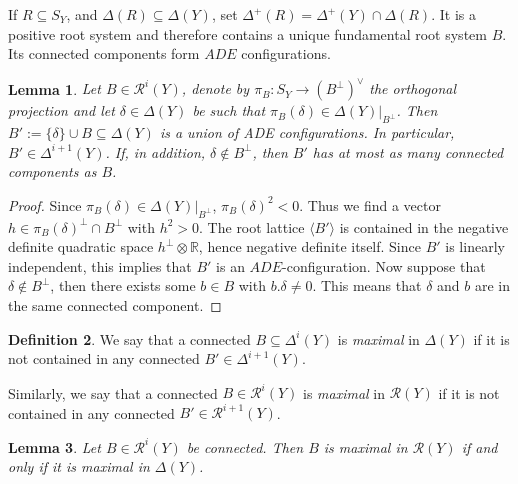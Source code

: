 \documentclass[a4paper]{amsart}
\theoremstyle{definition}
\newtheorem{definition}{Definition}[section]
\theoremstyle{plain}
\newtheorem{lemma}[definition]{Lemma}
\newcommand{\RR}{\mathbb{R}}
\newcommand{\R}{\mathcal{R}}
\begin{document}
If $R\subseteq S_Y$, and $\Delta(R)\subseteq \Delta(Y)$, set $\Delta^+(R)=\Delta^+(Y)\cap \Delta(R)$. It is a positive root system and therefore contains a unique fundamental root system $B$. Its connected components form $ADE$ configurations.

\begin{lemma}\label{lem:external_root}
Let $B \in \R^i(Y)$, denote by $\pi_B\colon S_Y \to (B^\perp)^\vee$ the orthogonal projection and let $\delta \in \Delta(Y)$ be such that $\pi_B(\delta) \in \Delta(Y)|_{B^\perp}$. Then $B':=\{\delta\} \cup B \subseteq \Delta(Y)$ is a union of ADE configurations. In particular, $B' \in \Delta^{i+1}(Y)$.
If, in addition, $\delta \not\in B^\perp$, then $B'$ has at most as many connected components as $B$.
\end{lemma}
\begin{proof}
Since $\pi_B(\delta) \in \Delta(Y)|_{B^\perp}$, $\pi_B(\delta)^2<0$. Thus we find a vector $h \in \pi_B(\delta)^\perp \cap B^\perp$ with $h^2>0$. 
The root lattice $\langle B' \rangle$ is contained in the negative definite quadratic space $h^\perp \otimes \RR$, hence negative definite itself.
Since $B'$ is linearly independent, this implies that $B'$ is an $ADE$-configuration.
Now suppose that $\delta \not \in B^\perp$, then there exists some $b \in B$ with $b.\delta \neq 0$. This means that $\delta$ and $b$ are in the same connected component. 
\end{proof}
\begin{definition}
We say that a connected $B\subseteq \Delta^i(Y)$ is \emph{maximal} in $\Delta(Y)$
if it is not contained in any connected $B' \in \Delta^{i+1}(Y)$.

Similarly, we say that a connected $B \in \R^i(Y)$ is \emph{maximal} in $\R(Y)$ if it is not contained in any connected $B' \in \R^{i+1}(Y)$.
\end{definition}
\begin{lemma}\label{lem:extend}
Let $B \in \R^i(Y)$ be connected. Then $B$ is maximal in $\R(Y)$ if and only if it is maximal in $\Delta(Y)$.
\end{lemma}
\end{document}
